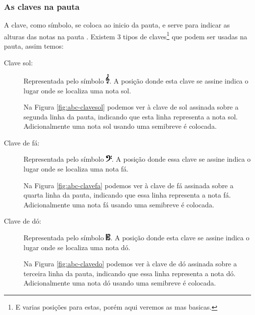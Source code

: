 \subsubsection{As claves na pauta}
\label{subsubsec:clavespauta}
A clave, como símbolo, 
se coloca ao inicio da pauta, 
e serve para indicar as alturas das notas na pauta \cite[pp. 179]{apel1969harvard} \cite[pp. 10]{cardoso1973curso}.
Existem 3 tipos de claves\footnote{E varias posições para estas, porém aqui veremos as mas basicas.} que podem ser usadas na pauta, 
assim temos: 
\begin{description}
\item [Clave sol:] Representada pelo símbolo \includegraphics[height=14pt]{chapters/cap-musica-basica/G-clef.eps}. 
A posição donde esta clave se assine indica o lugar onde se localiza uma nota sol. 
\begin{example}
Na Figura \ref{fig:abc-clavesol} podemos ver à clave de sol assinada sobre a segunda linha da pauta,
indicando que esta linha representa a nota sol.
Adicionalmente uma nota sol usando uma  semibreve é colocada.
\end{example} 
\item [Clave de fá:] Representada pelo símbolo \includegraphics[height=10pt]{chapters/cap-musica-basica/FClef.eps}. 
A posição donde essa clave se assine indica o lugar onde se localiza uma nota fá.
\begin{example}
Na Figura \ref{fig:abc-clavefa} podemos ver à clave de fá assinada sobre a quarta linha da pauta,
indicando que essa linha representa a nota fá.
Adicionalmente uma nota fá usando uma  semibreve é colocada.
\end{example} 
\item [Clave de dó:] Representada pelo símbolo \includegraphics[height=10pt]{chapters/cap-musica-basica/CClef.eps}.
A posição donde esta clave se assine indica o lugar onde se localiza uma nota dó.
\begin{example}
Na Figura \ref{fig:abc-clavedo} podemos ver à clave de dó assinada sobre a terceira linha da pauta,
indicando que essa linha representa a nota dó.
Adicionalmente uma nota dó usando uma  semibreve é colocada.
\end{example} 
\end{description}
